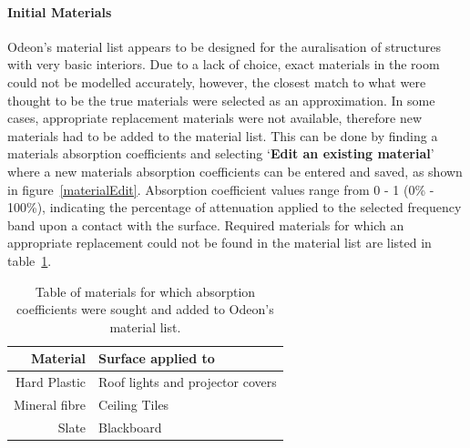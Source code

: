 \documentclass[../../main.tex]{subfiles}
\begin{document}
		\paragraph{Initial Materials}

			Odeon's material list appears to be designed for the auralisation of structures with very basic interiors. Due to a lack of choice, exact materials in the room could not be modelled accurately, however, the closest match to what were thought to be the true materials were selected as an approximation. In some cases, appropriate replacement materials were not available, therefore new materials had to be added to the material list. This can be done by finding a materials absorption coefficients and selecting `\textbf{Edit an existing material}' where a new materials absorption coefficients can be entered and saved, as shown in figure~\ref{materialEdit}. Absorption coefficient values range from 0 - 1 (0\% - 100\%), indicating the percentage of attenuation applied to the selected frequency band upon a contact with the surface. Required materials for which an appropriate replacement could not be found in the material list are listed in table~\ref{materialTable}.

			\begin{table}[H]
			\begin{center}
				\begin{tabular}{r l}
					\textbf{Material} & \textbf{Surface applied to} \\ \hline
					Hard Plastic \cite{plastic} & Roof lights and projector covers \\
					Mineral fibre \cite{mineralFibre} & Ceiling Tiles \\
					Slate \footnotemark[1] \cite{Kovalchik} & Blackboard \\
				\end{tabular}
			\end{center}
			\caption{Table of materials for which absorption coefficients were sought and added to Odeon's material list.}
			\label{materialTable}
			\end{table}

\end{document}
